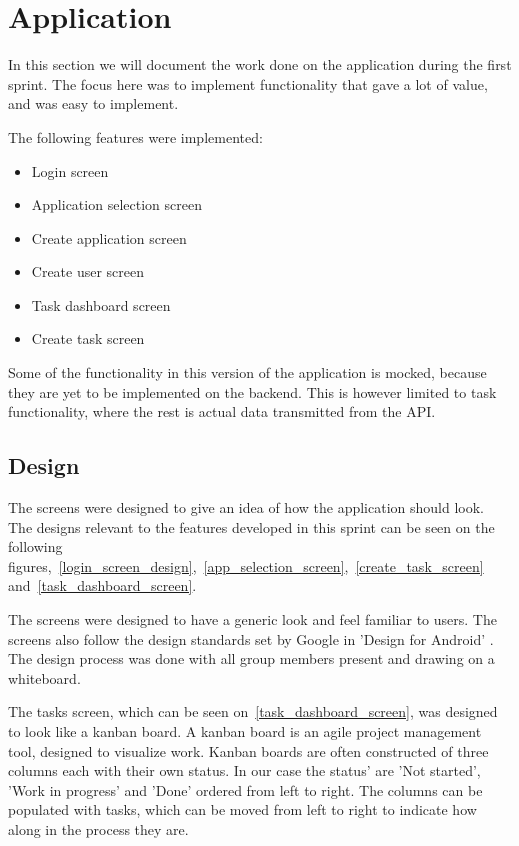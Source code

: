 \section{Application}\label{sec:sprint-one-application}
In this section we will document the work done on the application during the first sprint.
The focus here was to implement functionality that gave a lot of value, and was easy to implement.

The following features were implemented:
\begin{itemize}
    \item Login screen
    \item Application selection screen
    \item Create application screen
    \item Create user screen
    \item Task dashboard screen
    \item Create task screen
\end{itemize}

Some of the functionality in this version of the application is mocked, because they are yet to be implemented on the backend.
This is however limited to task functionality, where the rest is actual data transmitted from the API.

\subsection{Design}
\label{sprint_1_design}
The screens were designed to give an idea of how the application should look.
The designs relevant to the features developed in this sprint can be seen on the following figures,~\autoref{login_screen_design},~\autoref{app_selection_screen},~\autoref{create_task_screen} and~\autoref{task_dashboard_screen}.

The screens were designed to have a generic look and feel familiar to users.
The screens also follow the design standards set by Google in 'Design for Android' \cite{AndroidDesign}.
The design process was done with all group members present and drawing on a whiteboard.



The tasks screen, which can be seen on~\autoref{task_dashboard_screen}, was designed to look like a kanban board.
A kanban board is an agile project management tool, designed to visualize work.
Kanban boards are often constructed of three columns each with their own status. In our case the status' are 'Not started', 'Work in progress' and 'Done' ordered from left to right.
The columns can be populated with tasks, which can be moved from left to right to indicate how along in the process they are.

